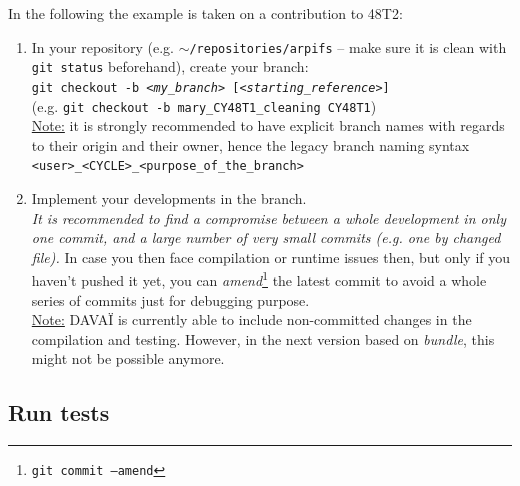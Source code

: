\documentclass[a4paper,10pt,twoside]{article}
\begin{document}
\noindent In the following the example is taken on a contribution to 48T2:
\begin{enumerate}[label=(\greek*)]
 \item In your repository (e.g. \texttt{$\sim$/repositories/arpifs} -- make sure it is clean with \texttt{git status} beforehand), create your branch:\\
 \texttt{git checkout -b \textit{<my\_branch>} [\textit{<starting\_reference>}]}\\
 (e.g. \texttt{git checkout -b mary\_CY48T1\_cleaning CY48T1})\\
 \underline{Note:} it is strongly recommended to have explicit branch names with regards to their origin and their owner, hence the legacy branch naming syntax \texttt{<user>\_<CYCLE>\_<purpose\_of\_the\_branch>}
 \item Implement your developments in the branch.\\
 \textit{It is recommended to find a compromise between a whole development in only one commit, and a large number of very small commits (e.g. one by changed file).} In case you then face compilation or runtime issues then, but only if you haven't pushed it yet, you can \textit{amend}\footnote{\texttt{git commit --amend}} the latest commit to avoid a whole series of commits just for debugging purpose.\\
 \underline{Note:} DAVAÏ is currently able to include non-committed changes in the compilation and testing. However, in the next version based on \textit{bundle}, this might not be possible anymore.
\end{enumerate}


\subsection{Run tests} 
\end{document}
